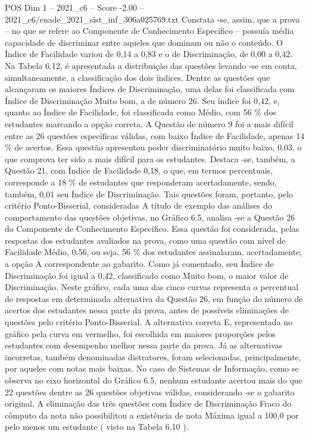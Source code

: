 \begin{textsample}{POS Dim 1 – 2021\_c6 – Score -2.00 – 2021\_c6/enade\_2021\_sist\_inf\_306a025769.txt}
Constata -se, assim, que a prova – no que se refere ao Componente de Conhecimento Específico – possuía média capacidade de discriminar entre aqueles que dominam ou não o conteúdo.
O Índice de Facilidade variou de 0,14 a 0,83 e o de Discriminação, de 0,00 a 0,42.
Na Tabela 6.12, é apresentada a distribuição das questões levando -se em conta, simultaneamente, a classificação dos dois índices.
Dentre as questões que alcançaram os maiores Índices de Discriminação, uma delas foi classificada com Índice de Discriminação Muito bom, a de número 26.
Seu índice foi 0,42, e, quanto ao Índice de Facilidade, foi classificada como Médio, com 56 \% dos estudantes marcando a opção correta.
A Questão de número 9 foi a mais difícil entre as 26 questões específicas válidas, com baixo Índice de Facilidade, apenas 14 \% de acertos.
Essa questão apresentou poder discriminatório muito baixo, 0,03, o que comprova ter sido a mais difícil para os estudantes.
Destaca -se, também, a Questão 21, com Índice de Facilidade 0,18, o que, em termos percentuais, corresponde a 18 \% de estudantes que responderam acertadamente, sendo, também, 0,01 seu Índice de Discriminação.
Tais questões foram, portanto, pelo critério Ponto-Bisserial, consideradas A título de exemplo das análises do comportamento das questões objetivas, no Gráfico 6.5, analisa -se a Questão 26 do Componente de Conhecimento Específico.
Essa questão foi considerada, pelas respostas dos estudantes avaliados na prova, como uma questão com nível de Facilidade Médio, 0,56, ou seja, 56 \% dos estudantes assinalaram, acertadamente, a opção A correspondente ao gabarito.
Como já comentado, seu Índice de Discriminação foi igual a 0,42, classificado como Muito bom, o maior valor de Discriminação.
Neste gráfico, cada uma das cinco curvas representa o percentual de respostas em determinada alternativa da Questão 26, em função do número de acertos dos estudantes nessa parte da prova, antes de possíveis eliminações de questões pelo critério Ponto-Bisserial.
A alternativa correta E, representada no gráfico pela curva em vermelho, foi escolhida em maiores proporções pelos estudantes com desempenho melhor nessa parte da prova.
Já as alternativas incorretas, também denominadas distratores, foram selecionadas, principalmente, por aqueles com notas mais baixas.
No caso de Sistemas de Informação, como se observa no eixo horizontal do Gráfico 6.5, nenhum estudante acertou mais do que 22 questões dentre as 26 questões objetivas válidas, considerando -se o gabarito original.
A eliminação das três questões com Índice de Discriminação Fraco do cômputo da nota não possibilitou a existência de nota Máxima igual a 100,0 por pelo menos um estudante ( visto na Tabela 6.10 ).

\end{textsample}
